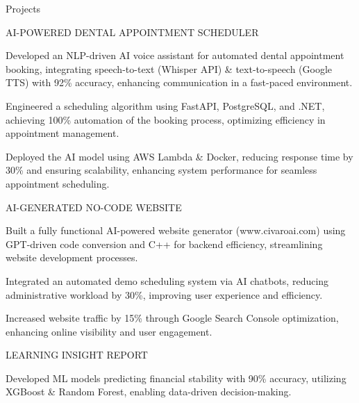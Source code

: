 \documentclass{resume} %
\begin{document}
    \begin{rSection}{Projects}
                    \begin{rSubsection}
                                    {AI{-}POWERED DENTAL APPOINTMENT SCHEDULER}
                                {}{}{}
                                    \item Developed an NLP{-}driven AI voice assistant for automated dental appointment booking, integrating speech{-}to{-}text (Whisper API) \& text{-}to{-}speech (Google TTS) with 92\% accuracy, enhancing communication in a fast{-}paced environment.
                                    \item Engineered a scheduling algorithm using FastAPI, PostgreSQL, and .NET, achieving 100\% automation of the booking process, optimizing efficiency in appointment management.
                                    \item Deployed the AI model using AWS Lambda \& Docker, reducing response time by 30\% and ensuring scalability, enhancing system performance for seamless appointment scheduling.
                            \end{rSubsection}
                    \begin{rSubsection}
                                    {AI{-}GENERATED NO{-}CODE WEBSITE}
                                {}{}{}
                                    \item Built a fully functional AI{-}powered website generator (www.civaroai.com) using GPT{-}driven code conversion and C++ for backend efficiency, streamlining website development processes.
                                    \item Integrated an automated demo scheduling system via AI chatbots, reducing administrative workload by 30\%, improving user experience and efficiency.
                                    \item Increased website traffic by 15\% through Google Search Console optimization, enhancing online visibility and user engagement.
                            \end{rSubsection}
                    \begin{rSubsection}
                                    {LEARNING INSIGHT REPORT}
                                {}{}{}
                                    \item Developed ML models predicting financial stability with 90\% accuracy, utilizing XGBoost \& Random Forest, enabling data{-}driven decision{-}making.

\end{rSubsection}
\end{rSection}
\end{document}
